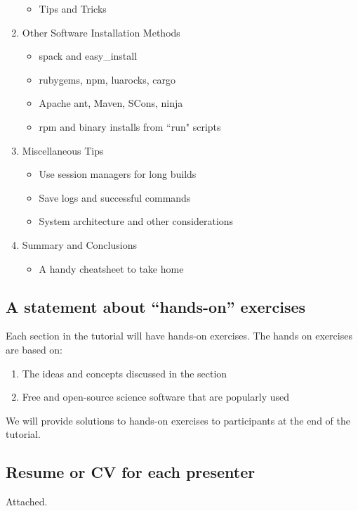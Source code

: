 \documentclass{report}
\begin{document}
\begin{enumerate}
\begin{itemize}
    \item Tips and Tricks
  \end{itemize}
\item Other Software Installation Methods
    \begin{itemize}
        \item spack and easy\_install
        \item rubygems, npm, luarocks, cargo
        \item Apache ant, Maven, SCons, ninja 
        \item rpm and binary installs from ``run" scripts
    \end{itemize}
\item Miscellaneous Tips
  \begin{itemize}
    \item Use session managers for long builds
    \item Save logs and successful commands
    \item System architecture and other considerations
  \end{itemize}
\item Summary and Conclusions
  \begin{itemize}
    \item A handy cheatsheet to take home
  \end{itemize}
\end{enumerate}

\subsection*{A statement about ``hands-on'' exercises}
Each section in the tutorial will have hands-on exercises. The hands on exercises are based on:
\begin{enumerate}
\item The ideas and concepts discussed in the section 
\item Free and open-source science software that are popularly used
\end{enumerate}
We will provide solutions to hands-on exercises to participants at the end of the tutorial.

\subsection*{Resume or CV for each presenter}
Attached.



\end{document}
